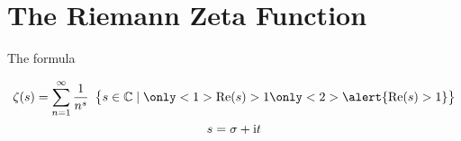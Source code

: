 \section{The Riemann Zeta Function}
\begin{namedframe}{The formula}
	\begin{definition}
		\[\zeta(s) = \sum_{n=1}^\infty \frac{1}{n^s} \restrict{s \in \complex \such \only<1>{\Re(s) > 1} \only<2>{\alert{\Re(s) > 1}}}\]
		\pause
		\[s = \sigma + \mathrm{i} t\]
	\end{definition}
\end{namedframe}
